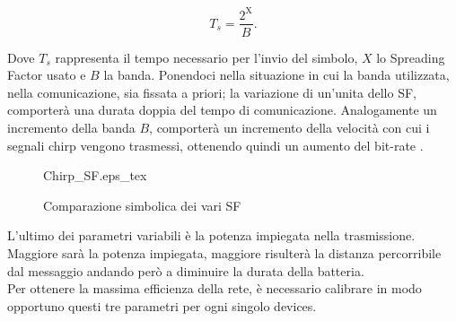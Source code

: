 \begin{equation}\label{eq:time_chirp}
        T_s=\frac{2^{\text{X}}}{B}.
\end{equation}

Dove $T_s$ rappresenta il tempo necessario per
l'invio del simbolo, $X$ lo Spreading Factor usato e $B$ la banda.
Ponendoci nella situazione in cui la banda utilizzata, nella comunicazione, sia fissata a
priori; la variazione di un'unita dello SF, comporterà una durata doppia del
tempo di comunicazione.
Analogamente un incremento della banda $B$, comporterà un
incremento della velocità con cui i segnali chirp vengono trasmessi, ottenendo
quindi un aumento del bit-rate .

\begin{figure}[ht]
        \centering 
        {Chirp_SF.eps_tex}
                \caption{Comparazione simbolica dei vari SF}
        \label{fig:sf_var}
\end{figure}

L'ultimo dei parametri variabili è la potenza impiegata nella trasmissione.
Maggiore sarà la potenza impiegata, maggiore risulterà la distanza percorribile
dal messaggio andando però a diminuire la durata della batteria.\\
Per ottenere la massima efficienza della rete, è necessario calibrare in modo
opportuno questi tre parametri per ogni singolo devices. 

